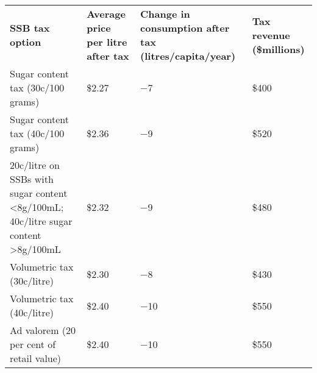 \onecolumn
\bgroup
\def\arraystretch{1.5}
\begin{tabularx}{\columnwidth}{l *3{>{\centering\arraybackslash}X}}
\toprule
\textbf{SSB tax option} & \textbf{Average price per litre after tax} & \textbf{Change in consumption after tax (litres/capita/year)} & \textbf{Tax revenue (\$millions)} \\ \cmidrule(lr){1-4}
Sugar content tax (30c/100 grams) & \$2.27 & $-$7 & \$400 \\
Sugar content tax (40c/100 grams) & \$2.36 & $-$9 & \$520 \\
\multicolumn{1}{p{7cm}}{20c/litre on SSBs with sugar content \textless{}8g/100mL; 40c/litre sugar content \textgreater{}8g/100mL} & \$2.32 & $-$9 & \$480 \\
Volumetric tax (30c/litre) & \$2.30 & $-$8 & \$430 \\
Volumetric tax (40c/litre) & \$2.40 & $-$10 & \$550 \\
Ad valorem (20 per cent of retail value) & \$2.40 & $-$10 & \$550 \\
\bottomrule
\end{tabularx}
\egroup
\twocolumn